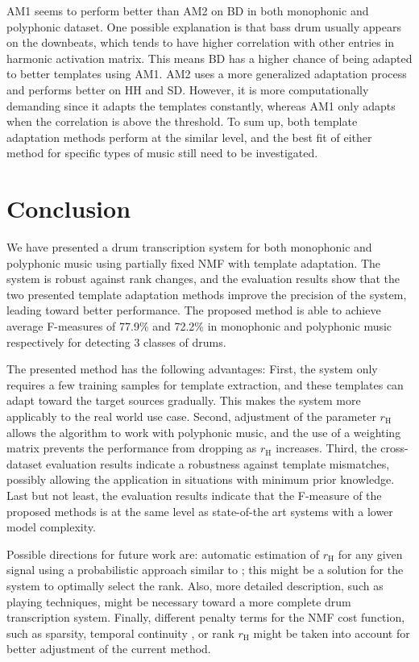 \documentclass{article}
\begin{document}
AM1 seems to perform better than AM2 on BD in both monophonic and polyphonic dataset. One possible explanation is that bass drum usually appears on the downbeats, which tends to have higher correlation with other entries in harmonic activation matrix. This means BD has a higher chance of being adapted to better templates using AM1. AM2 uses a more generalized adaptation process and performs better on HH and SD. However, it is more computationally demanding since it adapts the templates constantly, whereas AM1 only adapts when the correlation is above the threshold. To sum up, both template adaptation methods perform at the similar level, and the best fit of either method for specific types of music still need to be investigated. 

\section{Conclusion}\label{sec:Conclusion}
We have presented a drum transcription system for both monophonic and polyphonic music using partially fixed NMF with template adaptation. The system is robust against rank changes, and %
the evaluation results show that the two presented template adaptation methods improve the precision of the system, leading toward better performance. The proposed method is able to achieve average F-measures of 77.9\% and 72.2\% in monophonic and polyphonic music respectively for detecting 3 classes of drums. 

The presented method has the following advantages: 
First, the system only requires a few training samples for template extraction, and these templates can adapt toward the target sources gradually. This makes the system more applicably to the real world use case. Second, adjustment of the parameter $r_\mathrm{H}$ allows the algorithm to work with polyphonic music, and the use of a weighting matrix prevents the performance from dropping as $r_\mathrm{H}$ increases. Third, the cross-dataset evaluation results indicate a robustness against template mismatches, possibly allowing the application in situations with minimum prior knowledge. Last but not least, the evaluation results indicate that the F-measure of the proposed methods is at the same level as state-of-the art systems with a lower model complexity. 

Possible directions for future work are:
automatic estimation of $r_\mathrm{H}$ for any given signal using a probabilistic approach similar to  \cite{ouo_inmf_2010}; this might be a solution for the system to optimally select the rank. Also, more detailed description, such as playing techniques, might be necessary toward a more complete drum transcription system. Finally, different penalty terms for the NMF cost function, such as sparsity, temporal continuity \cite{virtanen_ssnmf_2007}, or rank $r_\mathrm{H}$ might be taken into account for better adjustment of the current method.   


\end{document}
